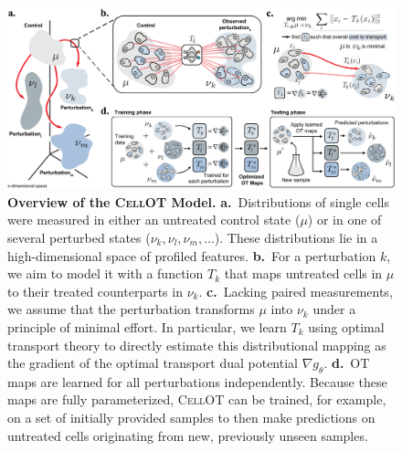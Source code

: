 \begin{figure}[t]
    \centering
    \includegraphics[width=\textwidth]{figures/fig_overview_cellot.pdf}
    \caption{\textbf{Overview of the \textsc{CellOT} Model.} \textbf{a.}~Distributions of single cells were measured in either an untreated control state ($\mu$) or in one of several perturbed states ($\nu_k, \nu_l, \nu_m,  \ldots$). These distributions lie in a high-dimensional space of profiled features. \textbf{b.}~For a perturbation $k$, we aim to model it with a function $T_k$ that maps untreated cells in $\mu$ to their treated counterparts in $\nu_k$. \textbf{c.}~Lacking paired measurements, we assume that the perturbation transforms $\mu$ into $\nu_k$ under a principle of minimal effort. In particular, we learn $T_k$ using optimal transport theory to directly estimate this distributional mapping as the gradient of the optimal transport dual potential $\nabla g_\theta$.
    \textbf{d.}~OT maps are learned for all perturbations independently. Because these maps are fully parameterized, \textsc{CellOT} can be trained, for example, on a set of initially provided samples to then make predictions on untreated cells originating from new, previously unseen samples.}
    \label{fig:overview_cellot}
\end{figure}


